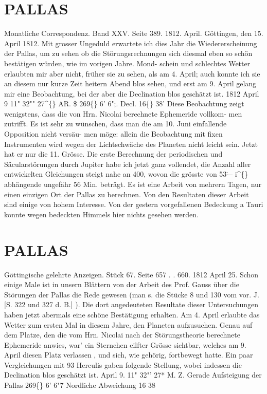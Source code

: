 \documentclass[12pt,a4paper]{article}
\newcommand{\degree}{\textdegree}
\begin{document}
\section*{PALLAS}
Monatliche    Correspondenz.     Band  XXV.    Seite  389.    1812.  April. 
Göttingen,  den  15.  April  1812. 
Mit  grosser  Ungeduld  erwartete  ich  dies  Jahr  die  Wiedererscheinung  der  Pallas,  um  zu  sehen 
ob  die  Störungsrechnungen  sich  diesmal  eben  so  schön  bestätigen  würden,  wie  im  vorigen  Jahre.  Mond- 
schein und  schlechtes  Wetter  erlaubten  mir  aber  nicht,  früher  sie  zu  sehen,  als  am  4.  April;  auch 
konnte  ich  sie  an  diesem  nur  kurze  Zeit  heitern  Abend  blos  sehen,  und  erst  am  9.  April  gelang  mir 
eine  Beobachtung,  bei  der  aber  die  Declination  blos  geschätzt  ist. 
1812  April  9    11"  32""  27\textasciicircum\{\}  AR.  \$  269\degree\{\}  6'  6";.     Decl.  16\degree\{\}  38' 
Diese  Beobachtung  zeigt  wenigstens,  dass  die  von  Hrn.  Nicolai  berechnete  Ephemeride  vollkom- 
men zutrifft.  Es  ist  sehr  zu  wünschen,  dass  man  die  am  10.  Juni  einfallende  Opposition  nicht  versäu- 
men möge:  allein  die  Beobachtung  mit  fixen  Instrumenten  wird  wegen  der  Lichtschwäche  des  Planeten 
nicht  leicht  sein.     Jetzt  hat  er  nur  die  11.  Grösse. 
Die  erste  Berechnung  der  periodischen  und  Säcularstörungen  durch  Jupiter  habe  ich  jetzt  ganz 
vollendet,  die  Anzahl  aller  entwickelten  Gleichungen  steigt  nahe  an  400,  wovon  die  grösste  von  53\.  ---  i\textasciicircum\{\} 
abhängende  ungefähr  56  Min.  beträgt.  Es  ist  eine  Arbeit  von  mehrern  Tagen,  nur  einen  einzigen  Ort 
der  Pallas  zu  berechnen.     Von  den  Resultaten  dieser  Arbeit  sind  einige  von  hohem  Interesse. 
Von  der  gestern  vorgefallenen  Bedeckung  a  Tauri  konnte  wegen  bedeckten  Himmels  hier  nichts 
gesehen  werden. 

\section*{PALLAS}
Göttingische  gelehrte  Anzeigen.    Stück  67.  Seite  657  .  .  660.     1812  April  25. 
Schon  einige  Male  ist  in  unsern  Blättern  von  der  Arbeit  des  Prof.  Gauss  über  die  Störungen  der 
Pallas  die  Rede  gewesen  (man  s.  die  Stücke  8  und  130  vom  vor.  J.  [S.  322  und  327  d.  B.] ).  Die  dort 
angedeuteten  Resultate  dieser  Untersuchungen  haben  jetzt  abermals  eine  schöne  Bestätigung  erhalten. 
Am  4.  April  erlaubte  das  Wetter  zum  ersten  Mal  in  diesem  Jahre,  den  Planeten  aufzusuchen.  Genau 
auf  dem  Platze,  den  die  vom  Hrn.  Nicolai  nach  der  Störungstheorie  berechnete  Ephemeride  anwies,  war' 
ein  Sternchen  eilfter  Grösse  sichtbar,  welches  am  9.  April  diesen  Platz  verlassen ,  und  sich,  wie  gehörig, 
fortbewegt  hatte.  Ein  paar  Vergleichungen  mit  93  Herculis  gaben  folgende  Stellung,  wobei  indessen 
die  Declination  blos  geschätzt  ist. 
April  9.     11"  32"'  27*  M.  Z.     Gerade  Aufsteigung  der  Pallas  269\degree\{\}    6'    6"7 
Nordliche  Abweichung     16    38 
\end{document}
